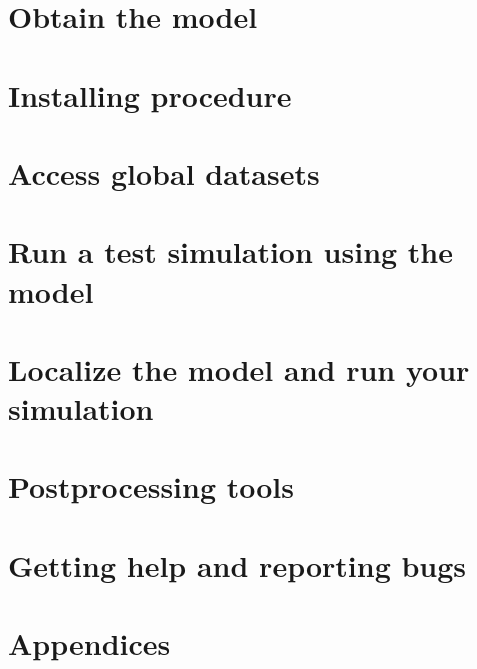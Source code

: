 \documentclass[10pt,twoside,a4paper]{report}
\begin{document}
\chapter{Obtain the model}


\chapter{Installing procedure}
\label{install}

\newpage

\chapter{Access global datasets}
\label{obdata}

\newpage

\chapter{Run a test simulation using the model}
\label{tutorial}

\newpage

\chapter{Localize the model and run your simulation}
\label{advanced}

\newpage

\chapter{Postprocessing tools}
\label{postproc}

\newpage

\chapter{Getting help and reporting bugs}
\label{tracker}

\newpage

\cleardoublepage

\chapter{Appendices}
\label{Appendice}


\newpage




\cleardoublepage

\evensidemargin=1.0cm
\oddsidemargin=1.5cm
\end{document}
